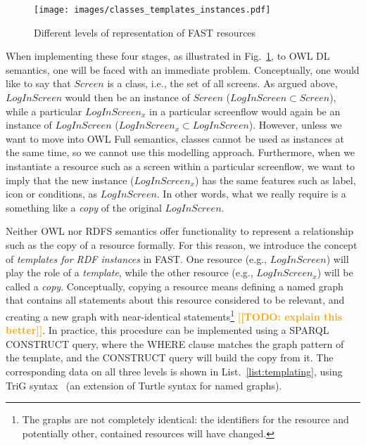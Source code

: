 \documentclass[twoside]{fast_latex}
\newcommand{\todo}[1]{\textsf{\textbf{\textcolor{Orange}{[[TODO: #1]]}}}}
\newcommand{\todo}[1]{}
\begin{document}
\begin{figure}[ht]
  \begin{center}
    \texttt{[image: images/classes\_templates\_instances.pdf]}
    \caption{Different levels of representation of FAST resources}
    \label{fig:classes_templates}
  \end{center}
\end{figure}

When implementing these four stages, as illustrated in Fig.~\ref{fig:classes_templates}, to OWL DL semantics, one will be faced with an immediate problem. Conceptually, one would like to say that $Screen$ is a class, i.e., the set of all screens. As argued above, $LogInScreen$ would then be an instance of $Screen$ ($LogInScreen \subset Screen$), while a particular $LogInScreen_x$ in a particular screenflow would again be an instance of $LogInScreen$ ($LogInScreen_x \subset LogInScreen$). However, unless we want to move into OWL Full semantics, classes cannot be used as instances at the same time, so we cannot use this modelling approach. Furthermore, when we instantiate a resource such as a screen within a particular screenflow, we want to imply that the new instance ($LogInScreen_x$) has the same features such as label, icon or conditions, as $LogInScreen$. In other words, what we really require is a something like a \emph{copy} of the original $LogInScreen$. 

Neither OWL nor RDFS semantics offer functionality to represent a relationship such as the copy of a resource formally. For this reason, we introduce the concept of \emph{templates for RDF instances} in FAST. One resource (e.g., $LogInScreen$) will play the role of a \emph{template}, while the other resource (e.g., $LogInScreen_x$) will be called a \emph{copy}. Conceptually, copying a resource means defining a named graph that contains all statements about this resource considered to be relevant, and creating a new graph with near-identical statements\footnote{The graphs are not completely identical: the identifiers for the resource and potentially other, contained resources will have changed.} \todo{explain this better}. In practice, this procedure can be implemented using a SPARQL CONSTRUCT query, where the WHERE clause matches the graph pattern of the template, and the CONSTRUCT query will build the copy from it. The corresponding data on all three levels is shown in List.~\ref{list:templating}, using TriG syntax~\cite{bizer2004trig} (an extension of Turtle syntax for named graphs).

\singlespacing
{}
\begin{figure}[ht]
	
\end{figure}
\doublespacing
\end{document}
